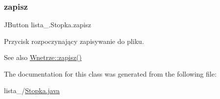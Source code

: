 \subsubsection{\texorpdfstring{zapisz}{zapisz}}
{\footnotesize\ttfamily J\+Button lista\+\_.\+Stopka.\+zapisz\hspace{0.3cm}{\ttfamily [private]}}

Przycisk rozpoczynający zapisywanie do pliku. \begin{DoxySeeAlso}{See also}
\mbox{\hyperlink{classlista__5_1_1_wnetrze_a3f2f50d048d7c41f2cbbb7f91f59c077}{Wnetrze\+::zapisz()}} 
\end{DoxySeeAlso}


The documentation for this class was generated from the following file\+:\begin{DoxyCompactItemize}
\item 
lista\+\_/\mbox{\hyperlink{_stopka_8java}{Stopka.\+java}}\end{DoxyCompactItemize}
